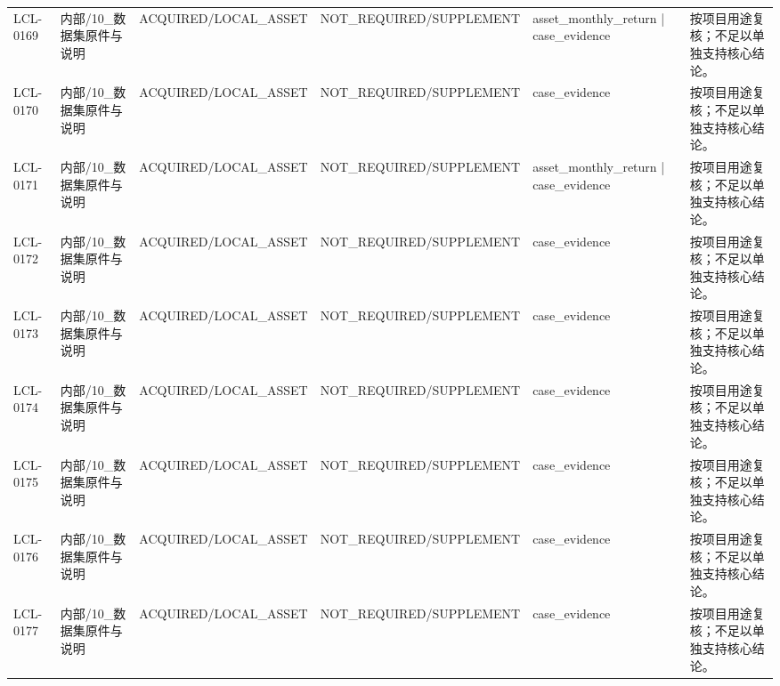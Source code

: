\begin{landscape}
\begin{longtable}{p{1.8cm}p{2.6cm}p{2.6cm}p{2.6cm}p{4.8cm}p{7.2cm}}
LCL-0169 & 内部/\allowbreak{}10\_\allowbreak{}数据集原件与说明 & ACQUIRED/\allowbreak{}LOCAL\_\allowbreak{}ASSET & NOT\_\allowbreak{}REQUIRED/\allowbreak{}SUPPLEMENT & asset\_\allowbreak{}monthly\_\allowbreak{}return | case\_\allowbreak{}evidence & 按项目用途复核；不足以单独支持核心结论。\\
LCL-0170 & 内部/\allowbreak{}10\_\allowbreak{}数据集原件与说明 & ACQUIRED/\allowbreak{}LOCAL\_\allowbreak{}ASSET & NOT\_\allowbreak{}REQUIRED/\allowbreak{}SUPPLEMENT & case\_\allowbreak{}evidence & 按项目用途复核；不足以单独支持核心结论。\\
LCL-0171 & 内部/\allowbreak{}10\_\allowbreak{}数据集原件与说明 & ACQUIRED/\allowbreak{}LOCAL\_\allowbreak{}ASSET & NOT\_\allowbreak{}REQUIRED/\allowbreak{}SUPPLEMENT & asset\_\allowbreak{}monthly\_\allowbreak{}return | case\_\allowbreak{}evidence & 按项目用途复核；不足以单独支持核心结论。\\
LCL-0172 & 内部/\allowbreak{}10\_\allowbreak{}数据集原件与说明 & ACQUIRED/\allowbreak{}LOCAL\_\allowbreak{}ASSET & NOT\_\allowbreak{}REQUIRED/\allowbreak{}SUPPLEMENT & case\_\allowbreak{}evidence & 按项目用途复核；不足以单独支持核心结论。\\
LCL-0173 & 内部/\allowbreak{}10\_\allowbreak{}数据集原件与说明 & ACQUIRED/\allowbreak{}LOCAL\_\allowbreak{}ASSET & NOT\_\allowbreak{}REQUIRED/\allowbreak{}SUPPLEMENT & case\_\allowbreak{}evidence & 按项目用途复核；不足以单独支持核心结论。\\
LCL-0174 & 内部/\allowbreak{}10\_\allowbreak{}数据集原件与说明 & ACQUIRED/\allowbreak{}LOCAL\_\allowbreak{}ASSET & NOT\_\allowbreak{}REQUIRED/\allowbreak{}SUPPLEMENT & case\_\allowbreak{}evidence & 按项目用途复核；不足以单独支持核心结论。\\
LCL-0175 & 内部/\allowbreak{}10\_\allowbreak{}数据集原件与说明 & ACQUIRED/\allowbreak{}LOCAL\_\allowbreak{}ASSET & NOT\_\allowbreak{}REQUIRED/\allowbreak{}SUPPLEMENT & case\_\allowbreak{}evidence & 按项目用途复核；不足以单独支持核心结论。\\
LCL-0176 & 内部/\allowbreak{}10\_\allowbreak{}数据集原件与说明 & ACQUIRED/\allowbreak{}LOCAL\_\allowbreak{}ASSET & NOT\_\allowbreak{}REQUIRED/\allowbreak{}SUPPLEMENT & case\_\allowbreak{}evidence & 按项目用途复核；不足以单独支持核心结论。\\
LCL-0177 & 内部/\allowbreak{}10\_\allowbreak{}数据集原件与说明 & ACQUIRED/\allowbreak{}LOCAL\_\allowbreak{}ASSET & NOT\_\allowbreak{}REQUIRED/\allowbreak{}SUPPLEMENT & case\_\allowbreak{}evidence & 按项目用途复核；不足以单独支持核心结论。\\

\end{longtable}
\end{landscape}
